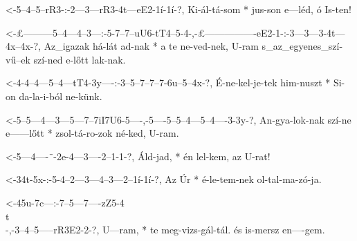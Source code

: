   {<-5--4--5--rR3-:-2---3---rR3-4t---eE2-1í-1í-?,}
  {  Ki-ál-tá-som * jus-son e---léd, ó   Is-ten!}

  {<-£---------5--4---4--3---:-5-7--7--uU6-tT4--5-4-,-£----------------eE2-1-:-3---3---3-4t---4x--4x-?,}
  {  Az_igazak há-lát ad-nak * a te ne-ved-nek, U-ram s_az_egyenes_szí-vű--ek  szí-ned e-lőtt lak-nak.}


  {<-4-4--4---5--4---tT4-3y----:-3--5--7--7--7-6u--5--4x-?,}
  {  É-ne-kel-je-tek him-nuszt * Si-on da-la-i-ból ne-künk.}

  {<-5--5---4---3---5---7--7iI7U6-5----,-5----5--5--4---5--4----3-3y-?,}
  {  An-gya-lok-nak szí-ne e------lőtt * zsol-tá-ro-zok né-ked, U-ram.}



  {<-5---4----¨-2e-4---3----2--1-1-?,}
  {  Áld-jad, * én lel-kem, az U-rat!}


  {<-34t-5x-:-5-4--2---3---4--3---2--1í-1í-?,}
  {  Az  Úr * é-le-tem-nek ol-tal-ma-zó-ja. }


  {<-45u-7c---:-7--5---7----zZ5-4\\t\\-,-3--4--5-----rR3E2-2-?,}
  {  U---ram, * te meg-vizs-gál-tál.     és is-mersz en----gem.}

